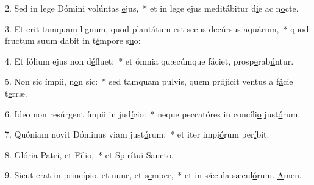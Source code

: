 2. Sed in lege Dómini volúntas \uline{e}jus,~* et in lege ejus meditábitur d\uline{i}e ac n\uline{o}cte.\par 
3. Et erit tamquam lignum, quod plantátum est secus decúrsus a\uline{quá}rum,~* quod fructum suum dabit in t\uline{é}mpore s\uline{u}o:\par 
4. Et fólium ejus non d\uline{é}fluet:~* et ómnia quæcúmque fáciet, prosp\uline{e}rab\uline{ú}ntur.\par 
5. Non sic ímpii, n\uline{o}n sic:~* sed tamquam pulvis, quem prójicit ventus a f\uline{á}cie t\uline{e}rræ.\par 
6. Ideo non resúrgent ímpii in jud\uline{í}cio:~* neque peccatóres in concíli\uline{o} just\uline{ó}rum.\par 
7. Quóniam novit Dóminus viam just\uline{ó}rum:~* et iter impi\uline{ó}rum per\uline{í}bit.\par 
8. Glória Patri, et F\uline{í}lio,~* et Spir\uline{í}tui S\uline{a}ncto.\par 
9. Sicut erat in princípio, et nunc, et s\uline{e}mper,~* et in sǽcula sæcul\uline{ó}rum. \uline{A}men.\par 
